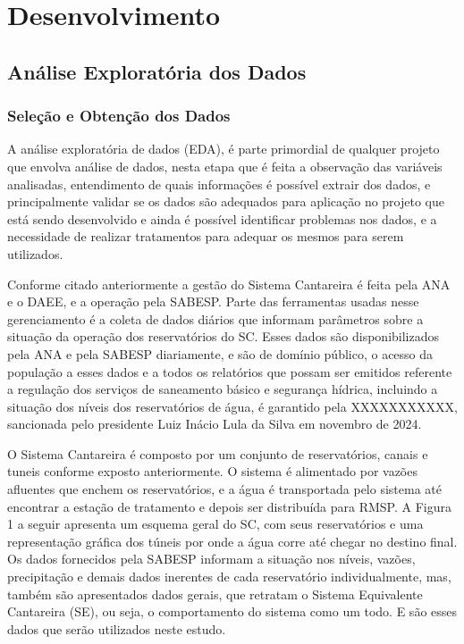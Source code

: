 \chapter{Desenvolvimento}

\section{Análise Exploratória dos Dados}

\subsection{Seleção e Obtenção dos Dados}

A análise exploratória de dados (EDA), é parte primordial de qualquer projeto que envolva análise de dados, nesta etapa que é feita a observação das variáveis analisadas, entendimento de quais informações é possível extrair dos dados, e principalmente validar se os dados são adequados para aplicação no projeto que está sendo desenvolvido e ainda é possível identificar problemas nos dados, e a necessidade de realizar tratamentos para adequar os mesmos para serem utilizados. 

Conforme citado anteriormente a gestão do Sistema Cantareira é feita pela ANA e o DAEE, e a operação pela SABESP. Parte das ferramentas usadas nesse gerenciamento é a coleta de dados diários que informam parâmetros sobre a situação da operação dos reservatórios do SC. Esses dados são disponibilizados pela ANA e pela SABESP diariamente, e são de domínio público, o acesso da população a esses dados e a todos os relatórios que possam ser emitidos referente a regulação dos serviços de saneamento básico e segurança hídrica, incluindo a situação dos níveis dos reservatórios de água, é garantido pela XXXXXXXXXXX, sancionada pelo presidente Luiz Inácio Lula da Silva em novembro de 2024.

O Sistema Cantareira é composto por um conjunto de reservatórios, canais e tuneis conforme exposto anteriormente. O sistema é alimentado por vazões afluentes que enchem os reservatórios, e a água é transportada pelo sistema até encontrar a estação de tratamento e depois ser distribuída para RMSP. A Figura 1 a seguir apresenta um esquema geral do SC, com seus reservatórios e uma representação gráfica dos túneis por onde a água corre até chegar no destino final. Os dados fornecidos pela SABESP informam a situação nos níveis, vazões, precipitação e demais dados inerentes de cada reservatório individualmente, mas, também são apresentados dados gerais, que retratam o Sistema Equivalente Cantareira (SE), ou seja, o comportamento do sistema como um todo. E são esses dados que serão utilizados neste estudo. 

